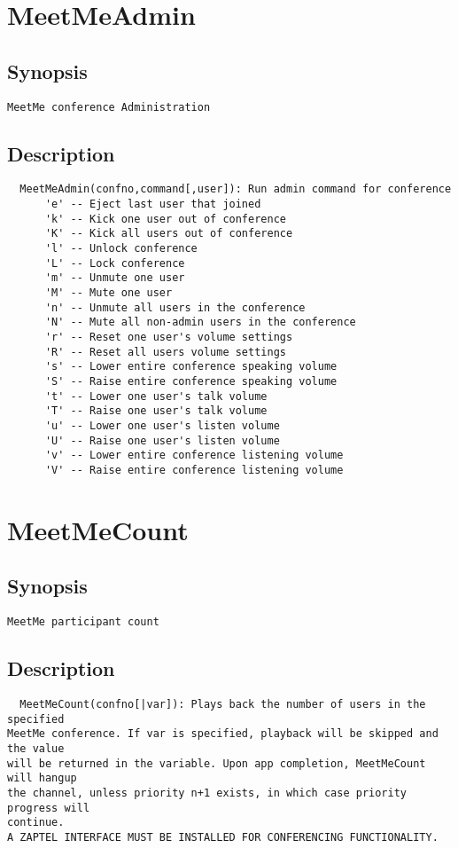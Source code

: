 \section{MeetMeAdmin}
\subsection{Synopsis}
\begin{verbatim}
MeetMe conference Administration
\end{verbatim}
\subsection{Description}
\begin{verbatim}
  MeetMeAdmin(confno,command[,user]): Run admin command for conference
      'e' -- Eject last user that joined
      'k' -- Kick one user out of conference
      'K' -- Kick all users out of conference
      'l' -- Unlock conference
      'L' -- Lock conference
      'm' -- Unmute one user
      'M' -- Mute one user
      'n' -- Unmute all users in the conference
      'N' -- Mute all non-admin users in the conference
      'r' -- Reset one user's volume settings
      'R' -- Reset all users volume settings
      's' -- Lower entire conference speaking volume
      'S' -- Raise entire conference speaking volume
      't' -- Lower one user's talk volume
      'T' -- Raise one user's talk volume
      'u' -- Lower one user's listen volume
      'U' -- Raise one user's listen volume
      'v' -- Lower entire conference listening volume
      'V' -- Raise entire conference listening volume

\end{verbatim}


\section{MeetMeCount}
\subsection{Synopsis}
\begin{verbatim}
MeetMe participant count
\end{verbatim}
\subsection{Description}
\begin{verbatim}
  MeetMeCount(confno[|var]): Plays back the number of users in the specified
MeetMe conference. If var is specified, playback will be skipped and the value
will be returned in the variable. Upon app completion, MeetMeCount will hangup
the channel, unless priority n+1 exists, in which case priority progress will
continue.
A ZAPTEL INTERFACE MUST BE INSTALLED FOR CONFERENCING FUNCTIONALITY.

\end{verbatim}


